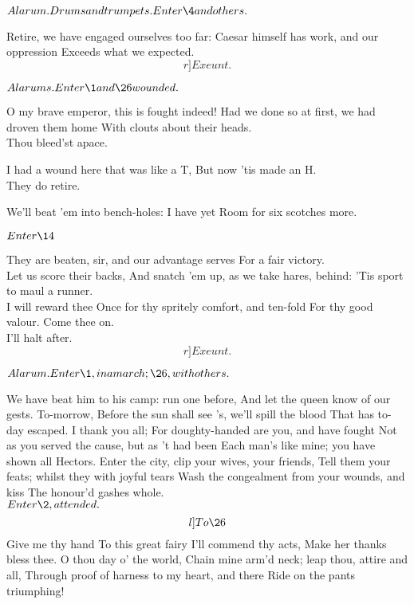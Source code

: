 \documentclass{book}
\begin{document}


	\(Alarum. Drums and trumpets. Enter \4 and others.\)

\4	Retire, we have engaged ourselves too far:
	Caesar himself has work, and our oppression
	Exceeds what we expected. 	\[r]Exeunt.\]


	\(Alarums. Enter \1 and \26 wounded.\)

	O my brave emperor, this is fought indeed!
	Had we done so at first, we had droven them home
	With clouts about their heads. \\

\1	Thou bleed'st apace.

	I had a wound here that was like a T,
	But now 'tis made an H. \\

\1	They do retire.

	We'll beat 'em into bench-holes: I have yet
	Room for six scotches more.

	\(Enter \14\)

	They are beaten, sir, and our advantage serves
	For a fair victory. \\

	Let us score their backs,
	And snatch 'em up, as we take hares, behind:
	'Tis sport to maul a runner. \\

\1	I will reward thee
	Once for thy spritely comfort, and ten-fold
	For thy good valour. Come thee on. \\

	I'll halt after. 	\[r]Exeunt.\]

\newpage



	\(Alarum. Enter \1, in a march; \26, with others.\)

\1	We have beat him to his camp: run one before,
	And let the queen know of our gests. To-morrow,
	Before the sun shall see 's, we'll spill the blood
	That has to-day escaped. I thank you all;
	For doughty-handed are you, and have fought
	Not as you served the cause, but as 't had been
	Each man's like mine; you have shown all Hectors.
	Enter the city, clip your wives, your friends,
	Tell them your feats; whilst they with joyful tears
	Wash the congealment from your wounds, and kiss
	The honour'd gashes whole. \\
   \(Enter \2, attended.\)
	\[l]To \26\] Give me thy hand
	To this great fairy I'll commend thy acts,
	Make her thanks bless thee. O thou day o' the world,
	Chain mine arm'd neck; leap thou, attire and all,
	Through proof of harness to my heart, and there
	Ride on the pants triumphing! \\
\end{document}

